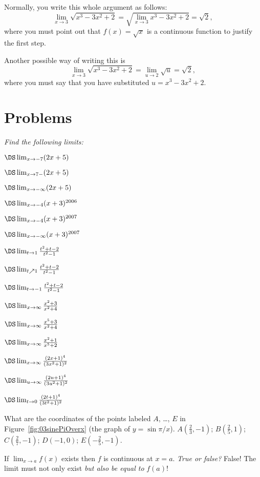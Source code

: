 Normally, you write this whole argument as follows:
\[
\lim_{x\to3}\sqrt{x^3 - 3x^2 + 2} =\sqrt{\lim_{x\to 3}x^3 - 3x^2 + 2}
=\sqrt 2,
\]
where you must point out that $f(x)=\sqrt x$ is a continuous function to
justify the first step.

Another possible way of writing this is
\[
\lim_{x\to3}\sqrt{x^3 - 3x^2 + 2} =\lim_{u\to 2}\sqrt u =\sqrt2,
\]
where you must say that you have substituted $u=x^3-3x^2+2$.

\section{Problems}
\problemfont
\textit{Find the following limits:}\\

\begin{multicols}{3}\setlength{\parindent}{0pt}

\problem $\DS \lim_{x\to -7}(2x+5) $

\problem $\DS \lim_{x\to 7-}(2x+5) $

\problem $\DS \lim_{x\to -\infty}(2x+5) $

\problem $\DS \lim_{x\to-4} (x+3)^{2006} $

\problem $\DS \lim_{x\to-4} (x+3)^{2007} $

\problem $\DS \lim_{x\to-\infty} (x+3)^{2007}$

\problem $\DS \lim_{t\to1}\frac{t^2+t-2}{t^2-1} $

\problem $\DS \lim_{t\nearrow1}\frac{t^2+t-2}{t^2-1} $

\problem $\DS \lim_{t\to-1}\frac{t^2+t-2}{t^2-1} $

\problem $\DS \lim_{x\to\infty}\frac{x^2+3}{x^2+4} $

\problem $\DS \lim_{x\to\infty}\frac{x^5+3}{x^2+4} $

\problem $\DS \lim_{x\to\infty}\frac{x^2+1}{x^5+2} $

\problem $\DS \lim_{x\to\infty} \frac{(2x+1)^4}{ (3x^2+1)^2} $

\problem $\DS \lim_{u\to\infty} \frac{(2u+1)^4}{ (3u^2+1)^2} $

\problem $\DS \lim_{t\to0} \frac{(2t+1)^4}{ (3t^2+1)^2}$
\end{multicols}
\problem What are the coordinates of the points labeled $A$, \ldots, $E$ in
Figure~\ref{fig:03sinePiOverx} (the graph of $y=\sin\pi/x$).
\answer
$A (\frac23,-1)$; $B (\frac25, 1)$; $C (\frac27,-1)$; $D(-1,0)$;
$E(-\frac25, -1)$.
\endanswer

\problem If $\lim_{x\to a} f(x)$ exists then $f$ is continuous at $x=a$.
\textit{True or false?}
\answer
False!  The limit must not only exist \textit{but also be equal to
}$f(a)$!
\endanswer


